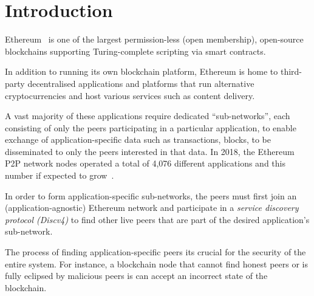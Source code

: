 
\section{Introduction}

Ethereum~\cite{buterin2013ethereum}  is one of the largest permission-less (\ie open membership),  open-source  blockchains supporting Turing-complete scripting via smart contracts. 

In addition to running its own blockchain platform, Ethereum is home to third-party decentralised applications and platforms that run alternative cryptocurrencies and host various services such as content delivery. 

A vast majority of these applications require dedicated ``sub-networks'', each consisting of only the peers participating in a particular application, to enable exchange of application-specific data such as transactions, blocks, \etc to be disseminated to only the peers interested in that data. In 2018, the Ethereum P2P network nodes operated a total of 4,076 different applications and this number if expected to grow~\cite{kim2018measuring}. 

In order to form application-specific sub-networks, the peers must first join an (application-agnostic) Ethereum network and participate in a \textit{service discovery protocol (Discv4)} to find other live peers that are part of the desired application's sub-network. 

The process of finding application-specific peers its crucial for the security of the entire system. For instance, a blockchain node that cannot find honest peers or is fully eclipsed by malicious peers is can accept an incorrect state of the blockchain. 

